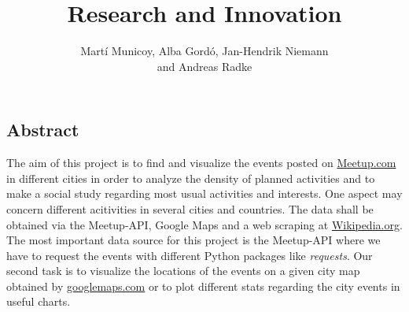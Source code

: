 \documentclass[12pt,a4paper]{article}
\author{Martí Municoy, Alba Gordó, Jan-Hendrik Niemann\\ and Andreas Radke}
\title{Research and Innovation}
\begin{document}
	\maketitle
	
\subsection*{Abstract}

The aim of this project is to find and visualize the events posted on \url{Meetup.com} in different cities in order to analyze the density of planned activities and to make a social study regarding most usual activities and interests. One aspect may concern different acitivities in several cities and countries. The data shall be obtained via the Meetup-API, Google Maps and a web scraping at \url{Wikipedia.org}. The most important data source for this project is the Meetup-API where we have to request the events with different Python packages like \emph{requests}. Our second task is to visualize the locations of the events on a given city map obtained by \url{googlemaps.com} or to plot different stats regarding the city events in useful charts. 

\tableofcontents
	









\newpage

{}

\end{document}
